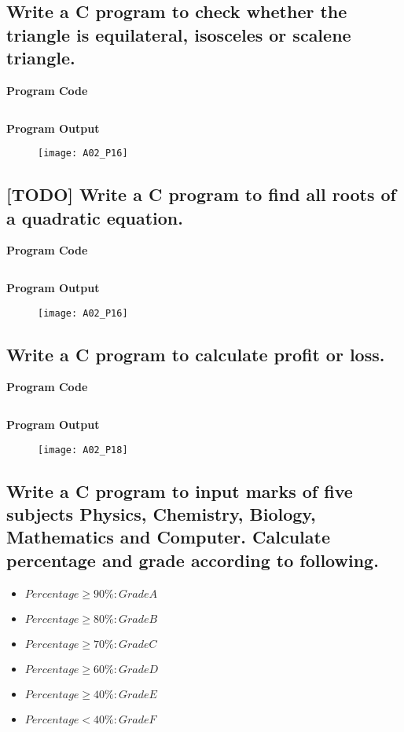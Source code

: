 \subsection{Write a C program to check whether the triangle is equilateral, isosceles or scalene triangle.}
\textbf{Program Code}
\inputminted[breaklines]{C}{programs/A02_P16.c}
\textbf{Program Output}
\begin{figure}[h]
  \texttt{[image: A02\_P16]}
\end{figure}
\pagebreak

\subsection{[TODO] Write a C program to find all roots of a quadratic equation.}
\textbf{Program Code}
\inputminted[breaklines]{C}{programs/A02_P17.c}
\textbf{Program Output}
\begin{figure}[h]
  \texttt{[image: A02\_P16]}
\end{figure}
\pagebreak

\subsection{Write a C program to calculate profit or loss.}
\textbf{Program Code}
\inputminted[breaklines]{C}{programs/A02_P18.c}
\textbf{Program Output}
\begin{figure}[h]
  \texttt{[image: A02\_P18]}
\end{figure}
\pagebreak

\subsection{Write a C program to input marks of five subjects Physics, Chemistry, Biology, Mathematics and Computer. Calculate percentage and grade according to following.}
\begin{itemize}
  \item $Percentage \geq 90\% : Grade A$
  \item $Percentage \geq 80\% : Grade B$
  \item $Percentage \geq 70\% : Grade C$
  \item $Percentage \geq 60\% : Grade D$
  \item $Percentage \geq 40\% : Grade E$
  \item $Percentage < 40\% : Grade F$
\end{itemize}


